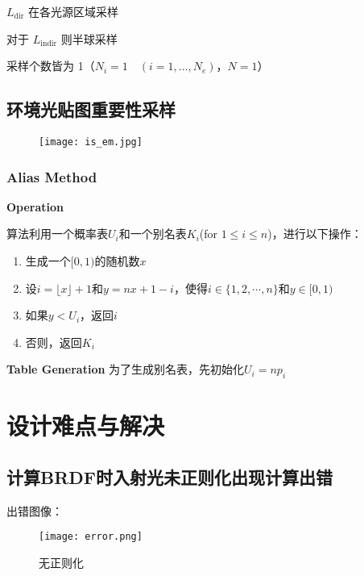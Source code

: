 \documentclass[14pt]{scrartcl} %
\begin{document}
$L_{\text{dir}}$ 在各光源区域采样

对于 $L_{\text{indir}}$ 则半球采样

采样个数皆为 1（$N_i=1\quad(i=1,\dots,N_e)$，$N=1$） 

\pagebreak

\subsection{环境光贴图重要性采样}
\begin{figure}[h] %
	\centering
	\texttt{[image: is\_em.jpg]} %
\end{figure}

\subsubsection{Alias Method}

\textbf{Operation}

算法利用一个概率表$U_i$和一个别名表$K_i$(for $1\leq i\leq n$)，进行以下操作：

\begin{enumerate}
	\item 生成一个$[0,1)$的随机数$x$
	\item 设$i=\lfloor x \rfloor+1$和$y=nx+1-i$，使得$i\in \{1,2,\cdots,n\}$和$y\in[0,1)$
	\item 如果$y<U_i$，返回$i$
	\item 否则，返回$K_i$
\end{enumerate}

\textbf{Table Generation}
为了生成别名表，先初始化$U_i=np_i$

\pagebreak
\section{设计难点与解决}

\subsection{计算BRDF时入射光未正则化出现计算出错}

出错图像：
\begin{figure}[h] %
	\centering
	\texttt{[image: error.png]} %
	\caption{无正则化}
\end{figure}
\end{document}
